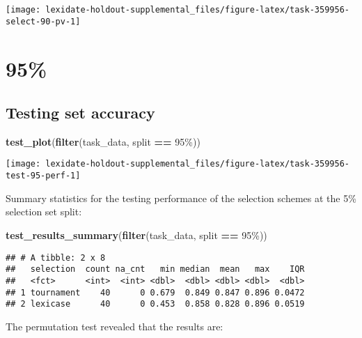 \documentclass[
]{book}
\newenvironment{Shaded}{\begin{snugshade}}{\end{snugshade}}
\newcommand{\FunctionTok}[1]{\textcolor[rgb]{0.13,0.29,0.53}{\textbf{#1}}}
\newcommand{\NormalTok}[1]{#1}
\newcommand{\SpecialCharTok}[1]{\textcolor[rgb]{0.81,0.36,0.00}{\textbf{#1}}}
\newcommand{\StringTok}[1]{\textcolor[rgb]{0.31,0.60,0.02}{#1}}
\begin{document}
\texttt{[image: lexidate-holdout-supplemental\_files/figure-latex/task-359956-select-90-pv-1]}

\hypertarget{section-29}{%
\section{95\%}\label{section-29}}

\hypertarget{testing-set-accuracy-29}{%
\subsection{Testing set accuracy}\label{testing-set-accuracy-29}}

\begin{Shaded}
\begin{Highlighting}[]
\FunctionTok{test\_plot}\NormalTok{(}\FunctionTok{filter}\NormalTok{(task\_data, split }\SpecialCharTok{==} \StringTok{\textquotesingle{}95\%\textquotesingle{}}\NormalTok{))}
\end{Highlighting}
\end{Shaded}

\texttt{[image: lexidate-holdout-supplemental\_files/figure-latex/task-359956-test-95-perf-1]}

Summary statistics for the testing performance of the selection schemes at the 5\% selection set split:

\begin{Shaded}
\begin{Highlighting}[]
\FunctionTok{test\_results\_summary}\NormalTok{(}\FunctionTok{filter}\NormalTok{(task\_data, split }\SpecialCharTok{==} \StringTok{\textquotesingle{}95\%\textquotesingle{}}\NormalTok{))}
\end{Highlighting}
\end{Shaded}

\begin{verbatim}
## # A tibble: 2 x 8
##   selection  count na_cnt   min median  mean   max    IQR
##   <fct>      <int>  <int> <dbl>  <dbl> <dbl> <dbl>  <dbl>
## 1 tournament    40      0 0.679  0.849 0.847 0.896 0.0472
## 2 lexicase      40      0 0.453  0.858 0.828 0.896 0.0519
\end{verbatim}

The permutation test revealed that the results are:
\end{document}
